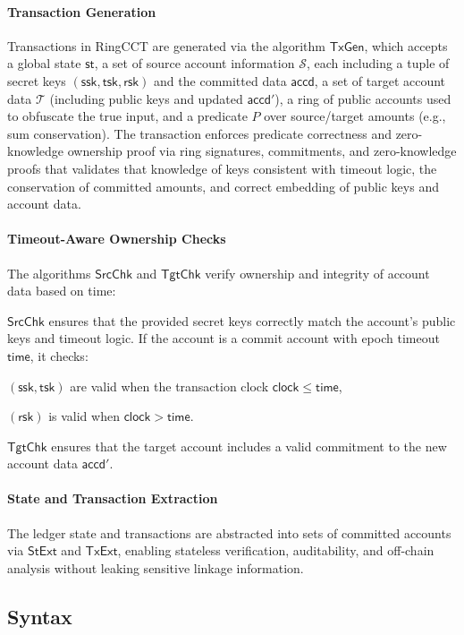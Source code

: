 \paragraph*{Transaction Generation}
Transactions in RingCCT are generated via the algorithm $\mathsf{TxGen}$, which accepts a global state $\mathsf{st}$, a set of source account information $\mathcal{S}$, each including a tuple of secret keys $(\mathsf{ssk}, \mathsf{tsk}, \mathsf{rsk})$ and the committed data $\mathsf{accd}$, a set of target account data $\mathcal{T}$ (including public keys and updated $\mathsf{accd}'$), a ring of public accounts used to obfuscate the true input, and a predicate $P$ over source/target amounts (e.g., sum conservation).
The transaction enforces predicate correctness and zero-knowledge ownership proof via ring signatures, commitments, and zero-knowledge proofs that validates that knowledge of keys consistent with timeout logic, the conservation of committed amounts, and correct embedding of public keys and account data.

\paragraph*{Timeout-Aware Ownership Checks}
The algorithms $\mathsf{SrcChk}$ and $\mathsf{TgtChk}$ verify ownership and integrity of account data based on time:

$\mathsf{SrcChk}$ ensures that the provided secret keys correctly match the account’s public keys and timeout logic. If the account is a commit account with epoch timeout $\mathsf{time}$, it checks:

$(\mathsf{ssk}, \mathsf{tsk})$ are valid when the transaction clock $\mathsf{clock} \leq \mathsf{time}$,

$(\mathsf{rsk})$ is valid when $\mathsf{clock} > \mathsf{time}$.

$\mathsf{TgtChk}$ ensures that the target account includes a valid commitment to the new account data $\mathsf{accd}'$.

\paragraph*{State and Transaction Extraction}
The ledger state and transactions are abstracted into sets of committed accounts via $\mathsf{StExt}$ and $\mathsf{TxExt}$, enabling stateless verification, auditability, and off-chain analysis without leaking sensitive linkage information.

\subsection{Syntax}

